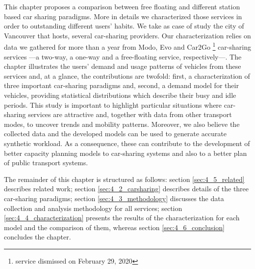 This chapter proposes a comparison between free floating and different station based car sharing paradigms. More in details we characterized those services in order to outstanding different users' habits. We take as case of study the city of Vancouver that hosts, several car-sharing providers. Our characterization relies on data we gathered for more than a year from Modo, Evo and Car2Go \footnote{service dismissed on February 29, 2020} car-sharing services ---a two-way, a one-way and a free-floating service, respectively---.
The chapter illustrates the users' demand and usage patterns of vehicles from these services and, at a glance, the contributions are twofold: first, a characterization of three important car-sharing paradigms and, second,  a demand model for their vehicles, providing statistical distributions which describe their busy and idle periods. 
This study is important to highlight particular situations where car-sharing services are attractive and, together with data from other transport modes, to uncover trends and mobility patterns. Moreover, we also believe the collected data and the developed models can be used to generate accurate synthetic workload. As a consequence, these can contribute to the development of better capacity planning models to car-sharing systems and also to a better plan of public transport systems.

The remainder of this chapter is structured as follows:  section \ref{sec:4_5_related} describes related work; section \ref{sec:4_2_carsharing} describes details of the three car-sharing paradigms; section \ref{sec:4_3_methodology} discusses the data collection and analysis methodology for all services; section \ref{sec:4_4_characterization} presents the results of the characterization for each model and the comparison of them, whereas section \ref{sec:4_6_conclusion} concludes the chapter.


